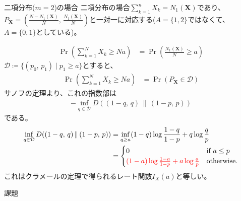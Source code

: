 \documentclass[lualatex,handout]{beamer}
\newcommand{\mycolor}[2]{%
  \begingroup
  \colorlet{currentcolor}{.}%
  \color{#1}#2%
  \color{currentcolor}%
  \endgroup
}
\newcommand{\emm}[1]{\mycolor{red}{#1}}
\newcommand\KL[2]{D(#1\,\|\,#2)}
\theoremstyle{definition}
\begin{document}
\begin{frame}{二項分布($m=2$)の場合}
\footnotesize
二項分布の場合$\sum_{k=1}^n X_k=N_1(\symbf{X})$であり、$P_{\symbf{X}}=\left(\frac{N-N_1(\symbf{X})}N,\,\frac{N_1(\symbf{X})}N\right)$と一対一に対応する($A=\{1,2\}$ではなくて、$A=\{0,1\}$としている)。

\begin{align*}
\Pr\left(\sum_{k=1}^N X_k \ge Na\right)
&=
\Pr\left(\frac{N_1(\symbf{X})}{N} \ge a\right)
\end{align*}
$\mathcal{D}\coloneq \{(p_0,\,p_1)\mid p_1\ge a\}$とすると、
\begin{align*}
\Pr\left(\sum_{k=1}^N X_k \ge Na\right)
&=
\Pr\left(P_{\symbf{X}} \in\mathcal{D}\right)
\end{align*}
サノフの定理より、これの指数部は
\begin{align*}
-\inf_{q\in\mathcal{D}} \KL{(1-q,\,q)}{(1-p,\,p)}
\end{align*}
である。
\begin{align*}
\inf_{q\in\mathcal{D}} \KL{(1-q,\,q)}{(1-p,\,p)}&= \inf_{q\ge a} (1-q)\log\frac{1-q}{1-p} + q\log\frac{q}{p}\\
&= 
\begin{cases}
0&\text{if } a\le p\\
\emm{(1-a)\log\frac{1-a}{1-p} + a\log\frac{a}{p}}& \text{otherwise.}
\end{cases}
\end{align*}
これはクラメールの定理で得られるレート関数$I_X(a)$と等しい。
\end{frame}

\begin{frame}{課題}
\end{frame}
\end{document}
